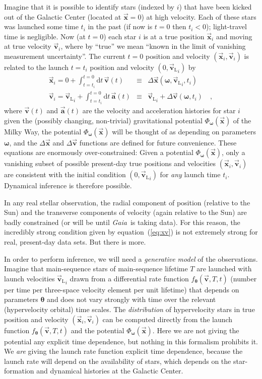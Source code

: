 \documentclass[12pt]{article}
\newcommand{\equationname}{equation}
\newcommand{\mission}[1]{\textsl{#1}}
\newcommand{\gaia}{\mission{Gaia}}
\newcommand{\tvector}[1]{\boldsymbol{\vec{#1}}}
\newcommand{\vx}{\tvector{x}}
\newcommand{\vv}{\tvector{v}}
\newcommand{\va}{\tvector{a}}
\newcommand{\vvlaunch}{{\vv_{\mathrm{L}}}} %
\newcommand{\pvector}[1]{\boldsymbol{#1}}
\newcommand{\vtheta}{\pvector{\theta}}
\newcommand{\vomega}{\pvector{\omega}}
\newcommand{\dd}{\mathrm{d}}
\newcommand{\flaunch}{f_{\vtheta}}
\newcommand{\potential}{\Phi_{\vomega}}
\begin{document}
Imagine that it is possible to identify stars (indexed by $i$) that
have been kicked out of the Galactic Center (located at $\vx=0$) at
high velocity.  Each of these stars was launched some time $t_i$ in
the past (if now is $t=0$ then $t_i<0$); light-travel time is
negligible.  Now (at $t=0$) each star $i$ is at a true position $\vx_i$
and moving at true velocity $\vv_i$, where by ``true'' we mean ``known
in the limit of vanishing measurement uncertainty''.  The current
$t=0$ position and velocity $(\vx_i,\vv_i)$ is related to the launch
$t=t_i$ position and velocity $(0,\vvlaunch_i)$ by
\begin{eqnarray}\label{eq:xv}\displaystyle
\vx_i = 0+\int_{t=t_i}^{t=0}\dd t\,\vv(t)
 &\equiv& \Delta\vx(\vomega,\vvlaunch_i,t_i) \nonumber\\
\vv_i = \vvlaunch_i+\int_{t=t_i}^{t=0}\dd t\,\va(t)
 &\equiv& \vvlaunch_i+\Delta\vv(\vomega,t_i) \quad ,
\end{eqnarray}
where $\vv(t)$ and $\va(t)$ are the velocity and acceleration
histories for star $i$ given the (possibly changing, non-trivial)
gravitational potential $\potential(\vx)$ of the Milky Way, the
potential $\potential(\vx)$ will be thought of as depending on
parameters $\vomega$, and the $\Delta\vx$ and $\Delta\vv$ functions
are defined for future convenience.  These equations are enormously
over-constrained: Given a potential $\potential(\vx)$, only a
vanishing subset of possible present-day true positions and velocities
$(\vx_i,\vv_i)$ are consistent with the initial condition
$(0,\vvlaunch_i)$ for \emph{any} launch time $t_i$.  Dynamical
inference is therefore possible.

In any real stellar observation, the radial component of position
(relative to the Sun) and the transverse components of velocity (again
relative to the Sun) are badly constrained (or will be until \gaia\ is
taking data).  For this reason, the incredibly strong condition given
by \equationname~(\ref{eq:xv}) is not extremely strong for real,
present-day data sets.  But there is more.

In order to perform inference, we will need a \emph{generative model}
of the observations.  Imagine that main-sequence stars of
main-sequence lifetime $T$ are launched with launch velocities
$\vvlaunch_i$ drawn from a differential rate function
$\flaunch(\vv,T,t)$ (number per time per three-space velocity element
per unit lifetime) that depends on parameters $\vtheta$ and does not
vary strongly with time over the relevant (hypervelocity orbital) time
scales.  The \emph{distribution} of hypervelocity stars in true
position and velocity $(\vx_i,\vv_i)$ can be computed directly from
the launch function $\flaunch(\vv,T,t)$ and the potential
$\potential(\vx)$.  Here we are not giving the potential any explicit
time dependence, but nothing in this formalism prohibits it.  We
\emph{are} giving the launch rate function explicit time dependence,
because the launch rate will depend on the availability of stars,
which depends on the star-formation and dynamical histories at the
Galactic Center.
\end{document}
